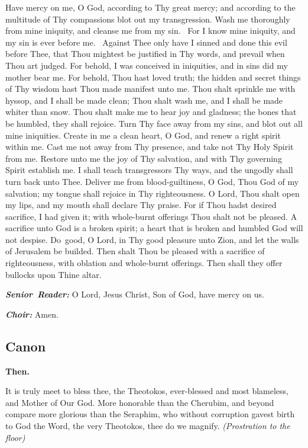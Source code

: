 Have mercy on me, O God, according to Thy great mercy; and according to the multitude of Thy compassions blot out my transgression. 
Wash me thoroughly from mine iniquity, and cleanse me from my sin.
~For I know mine iniquity, and my sin is ever before me.
~Against Thee only have I sinned and done this evil before Thee, that Thou mightest be justified
in Thy words, and prevail when Thou art judged. 
For behold, I was conceived in iniquities, and in sins did my mother bear me. 
For behold, Thou hast loved truth; the hidden and secret things of Thy wisdom hast Thou made manifest unto me. 
Thou shalt sprinkle me with hyssop, and I shall be made clean; 
Thou shalt wash me, and I shall be made whiter than snow. 
Thou shalt make me to hear joy and gladness; 
the bones that be humbled, they shall rejoice. 
Turn Thy face away from my sins, and blot out all mine iniquities. 
Create in me a clean heart, O God, and renew a right spirit within me. 
Cast me not away from Thy presence, and take not Thy Holy Spirit from me. 
Restore unto me the joy of Thy salvation, and with Thy governing Spirit establish me. 
I shall teach transgressors Thy ways, and the ungodly shall turn back unto Thee. 
Deliver me from blood-guiltiness, O God, Thou God of my salvation; 
my tongue shall rejoice in Thy righteousness. 
O Lord, Thou shalt open my lips, and my mouth shall declare Thy praise. 
For if Thou hadst desired sacrifice, I had given it; 
with whole-burnt offerings Thou shalt not be pleased. 
A sacrifice unto God is a broken spirit; 
a heart that is broken and humbled God will not despise. 
Do~good, O Lord, in Thy good pleasure unto Zion, and let the walls of Jerusalem be builded. 
Then shalt Thou be pleased with a sacrifice of righteousness, with oblation and whole-burnt offerings. 
Then shall they offer bullocks upon Thine altar.

\textbf{\emph{Senior~Reader:}}
 O Lord, Jesus Christ, Son of God, have mercy on us.

\textbf{\emph{Choir:}}
 Amen.
\subsection{Canon}


\textbf{Then.}

It is truly meet to bless thee, the Theotokos, ever-blessed and most blameless, and Mother of Our God.
 More honorable than the Cherubim, and beyond compare more glorious than the Seraphim, who without corruption gavest birth to God the Word, the very Theotokos, thee do we magnify.
\emph{(Prostration to the floor)}

